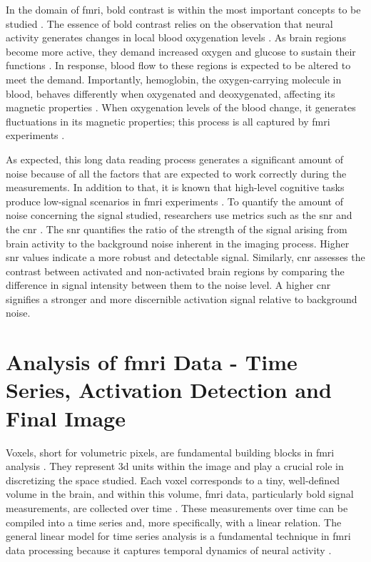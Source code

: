 In the domain of \gls{fmri}, \gls{bold} contrast is within the most important 
concepts to be studied \cite{logothetis2004nature}. The essence of \gls{bold} 
contrast relies on the observation that neural activity generates changes in 
local blood oxygenation levels \cite{lindquist2008rapid}. As brain regions 
become more active, they demand increased oxygen and glucose to sustain their 
functions \cite{lindquist2008statistical}. In response, blood flow to these 
regions is expected to be altered to meet the demand. Importantly, hemoglobin, 
the oxygen-carrying molecule in blood, behaves differently when oxygenated 
and deoxygenated, affecting its magnetic properties 
\cite{uyuklu2009effect, pauling1936magnetic, bren2015discovery}. When 
oxygenation levels of the blood change, it generates fluctuations in its 
magnetic properties; this process is all captured by \gls{fmri} experiments
 \cite{buxton2012dynamic}.

As expected, this long data reading process generates a significant amount 
of noise because of all the factors that are expected to work correctly during 
the measurements. In addition to that, it is known that high-level cognitive 
tasks produce low-signal scenarios in \gls{fmri} experiments 
\cite{cui2011quantitative}. To quantify the amount of noise concerning the 
signal studied, researchers use metrics such as the \gls{snr} and the
 \gls{cnr} \cite{welvaert2013definition}. The \gls{snr} quantifies the ratio 
 of the strength of the signal arising from brain activity to the background 
 noise inherent in the imaging process. Higher \gls{snr} values indicate a 
 more robust and detectable signal. Similarly, \gls{cnr} assesses the contrast 
 between activated and non-activated brain regions by comparing the difference 
 in signal intensity between them to the noise level. A higher \gls{cnr} 
 signifies a stronger and more discernible activation signal relative to 
 background noise.

\section{Analysis of \texorpdfstring{\gls{fmri}}{fMRI} Data - Time Series, 
Activation Detection and Final Image}

Voxels, short for volumetric pixels, are fundamental building blocks in 
\gls{fmri} analysis \cite{norman2006beyond}. They represent \gls{3d} units 
within the image and play a crucial role in discretizing the space studied. 
Each voxel corresponds to a tiny, well-defined volume in the brain, and within 
this volume, \gls{fmri} data, particularly \gls{bold} signal measurements, 
are collected over time \cite{li2009voxel}. These measurements over time can 
be compiled into a time series and, more specifically, with a linear relation. 
The general linear model for time series analysis is a fundamental technique 
in \gls{fmri} 
data processing because it captures temporal dynamics of neural activity
 \cite{kiebel2007general, friston1994statistical}.

